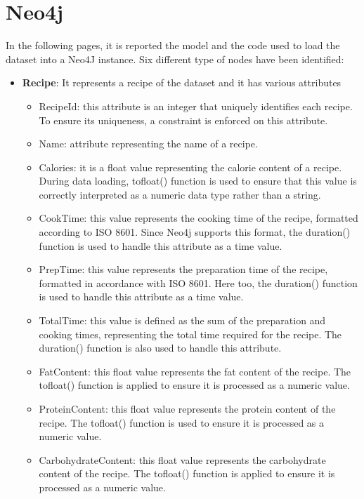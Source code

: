 \section{Neo4j}
In the following pages, it is reported the model and the code used to load the dataset into a Neo4J instance. 
Six different type of nodes have been identified:
\begin{itemize}
    \item \textbf{Recipe}: It represents a recipe of the dataset and it has various attributes
          \begin{itemize}
              \item RecipeId: this attribute is an integer that uniquely identifies each recipe. To ensure its uniqueness, a constraint is enforced on this attribute.
              \item Name: attribute representing the name of a recipe.
              \item Calories: it is a float value representing the calorie content of a recipe. During data loading, tofloat() function is used to ensure that this value is correctly interpreted as a numeric data type rather than a string.
              \item CookTime: this value represents the cooking time of the recipe, formatted according to ISO 8601. Since Neo4j supports this format,  the duration() function is used to handle this attribute as a time value.
              \item PrepTime: this value represents the preparation time of the recipe, formatted in accordance with ISO 8601. Here too, the duration() function is used to handle this attribute as a time value.
              \item TotalTime: this value is defined as the sum of the preparation and cooking times, representing the total time required for the recipe. The duration() function is also used to handle this attribute.
              \item FatContent: this float value represents the fat content of the recipe. The tofloat() function is applied to ensure it is processed as a numeric value.
              \item ProteinContent: this float value represents the protein content of the recipe. The tofloat() function is used to ensure it is processed as a numeric value.
              \item CarbohydrateContent: this float value represents the carbohydrate content of the recipe. The tofloat() function is applied to ensure it is processed as a numeric value.

\end{itemize}
\end{itemize}
